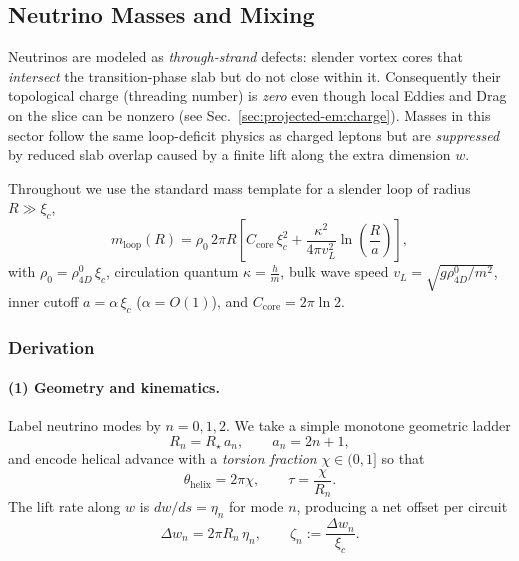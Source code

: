 \subsection{Neutrino Masses and Mixing}

Neutrinos are modeled as \emph{through-strand} defects: slender vortex cores that \emph{intersect} the transition-phase slab but do not close within it. Consequently their topological charge (threading number) is \emph{zero} even though local Eddies and Drag on the slice can be nonzero (see Sec.~\ref{sec:projected-em:charge}). Masses in this sector follow the same loop-deficit physics as charged leptons but are \emph{suppressed} by reduced slab overlap caused by a finite lift along the extra dimension $w$.

Throughout we use the standard mass template for a slender loop of radius $R\gg \xi_c$,
\begin{equation}
\label{eq:nu:mass-template}
m_{\text{loop}}(R)
=\rho_0\,2\pi R\left[
C_{\mathrm{core}}\,\xi_c^2
+\frac{\kappa^2}{4\pi v_L^2}\ln\!\left(\frac{R}{a}\right)\right],
\end{equation}
with $\rho_0=\rho_{4D}^0\,\xi_c$, circulation quantum $\kappa=\frac{h}{m}$, bulk wave speed $v_L=\sqrt{g\rho_{4D}^0/m^{2}}$, inner cutoff $a=\alpha\,\xi_c$ ($\alpha=O(1)$), and $C_{\mathrm{core}}=2\pi\ln 2$.

\subsubsection{Derivation}

\paragraph{(1) Geometry and kinematics.}
Label neutrino modes by $n=0,1,2$. We take a simple monotone geometric ladder
\begin{equation}
R_n=R_\star\,a_n,\qquad a_n=2n+1,
\end{equation}
and encode helical advance with a \emph{torsion fraction} $\chi\in(0,1]$ so that
\begin{equation}
\theta_{\mathrm{helix}}=2\pi\chi,\qquad \tau=\frac{\chi}{R_n}.
\end{equation}
The lift rate along $w$ is $dw/ds=\eta_n$ for mode $n$, producing a net offset per circuit
\begin{equation}
\Delta w_n=2\pi R_n\,\eta_n,\qquad
\zeta_n:=\frac{\Delta w_n}{\xi_c}.
\end{equation}


